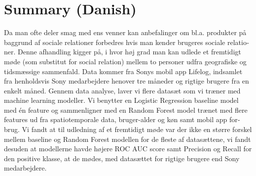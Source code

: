 \chapter{Summary (Danish)}
\begin{otherlanguage}{danish}

Da man ofte deler smag med ens venner kan anbefalinger om bl.a. produkter på baggrund af sociale relationer forbedres hvis man kender brugeres sociale relationer.
Denne afhandling kigger på, i hvor høj grad man kan udlede et fremtidigt møde (som substitut for social relation) mellem to personer udfra geografiske og tidsmæssige sammenfald.
Data kommer fra Sonys mobil app Lifelog, indsamlet fra henholdsvis Sony medarbejdere henover tre måneder og rigtige brugere fra en enkelt måned.
Gennem data analyse, laver vi flere datasæt som vi træner med machine learning modeller.
Vi benytter en Logistic Regression baseline model med én feature og sammenligner med en Random Forest model trænet med flere features ud fra spatiotemporale data, bruger-alder og køn samt mobil app forbrug. Vi fandt at til udledning af et fremtidigt møde var der ikke en større forskel mellem baseline og Random Forest modellen for de fleste af datasættene, vi fandt desuden at modellerne havde højere ROC AUC score samt Precision og Recall for den positive klasse, at de mødes, med datasættet for rigtige brugere end Sony medarbejdere.

\end{otherlanguage}